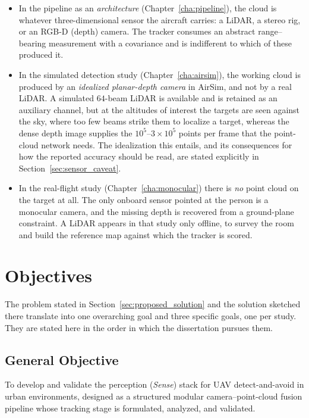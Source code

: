 \begin{itemize}
  \item In the pipeline as an \emph{architecture} (Chapter~\ref{cha:pipeline}),
  the cloud is whatever three-dimensional sensor the aircraft carries: a LiDAR, a
  stereo rig, or an RGB-D (depth) camera. The tracker consumes an abstract
  range--bearing measurement with a covariance and is indifferent to which of
  these produced it.
  \item In the simulated detection study (Chapter~\ref{cha:airsim}), the working
  cloud is produced by an \emph{idealized planar-depth camera} in AirSim, and not
  by a real LiDAR. A simulated $64$-beam LiDAR is available and is retained as an
  auxiliary channel, but at the altitudes of interest the targets are seen against
  the sky, where too few beams strike them to localize a target, whereas the dense
  depth image supplies the $10^{5}$--$3\times10^{5}$ points per frame that the
  point-cloud network needs. The idealization this entails, and its consequences
  for how the reported accuracy should be read, are stated explicitly in
  Section~\ref{sec:sensor_caveat}.
  \item In the real-flight study (Chapter~\ref{cha:monocular}) there is
  \emph{no} point cloud on the target at all. The only onboard sensor pointed at
  the person is a monocular camera, and the missing depth is recovered from a
  ground-plane constraint. A LiDAR appears in that study only offline, to survey
  the room and build the reference map against which the tracker is scored.
\end{itemize}

\section{Objectives}

The problem stated in Section~\ref{sec:proposed_solution} and the solution
sketched there translate into one overarching goal and three specific goals, one
per study. They are stated here in the order in which the dissertation pursues
them.

\subsection{General Objective}

To develop and validate the perception (\emph{Sense}) stack for UAV
detect-and-avoid in urban environments, designed as a structured modular
camera--point-cloud fusion pipeline whose tracking stage is
formulated, analyzed, and validated.

